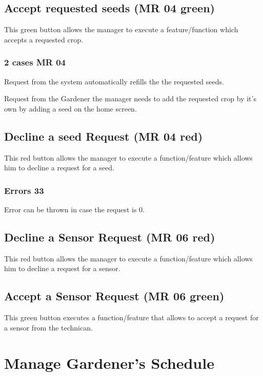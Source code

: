 \subsection{Accept requested seeds (MR 04 green)}
This green button allows the manager to execute a feature/function which accepts
a requested crop. 
\subsubsection{2 cases MR 04}
 
Request from the system automatically refills the the requested seeds.

Request from the Gardener the manager needs to add the requested crop by
it's own by adding a seed on the home screen.

\subsection{Decline a seed Request (MR 04 red)}
This red button allows the manager to execute a function/feature which allows
him to decline a request for a seed.

\subsubsection{Errors 33}
Error can be thrown in case the request is 0.


\subsection{Decline a Sensor Request (MR 06 red)}
This red button allows the manager to execute a function/feature which allows
him to decline a request for a sensor.
\subsection{Accept a Sensor Request (MR 06 green)}
This green button executes a function/feature that allows to accept a request
for a sensor from the technican.




\newpage
\section{Manage Gardener's Schedule}
\label{sec:appendix_ManageGardenerSchedule}
\mbox{} \par
\noindent{}

